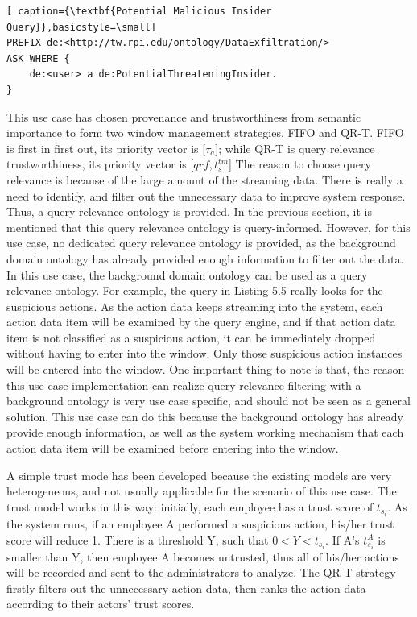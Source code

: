 \begin{lstlisting}[ caption={\textbf{Potential Malicious Insider Query}},basicstyle=\small]
PREFIX de:<http://tw.rpi.edu/ontology/DataExfiltration/>
ASK WHERE { 
    de:<user> a de:PotentialThreateningInsider.
}
\end{lstlisting}

This use case has chosen provenance and trustworthiness from semantic importance to form two window management strategies, FIFO and QR-T. 
FIFO is first in first out, its priority vector is [$\tau_{a}$]; 
while QR-T is query relevance trustworthiness, its priority vector is [$qrf, t^{tm}_{s}$]
The reason to choose query relevance is because of the large amount of the streaming data. 
There is really a need to identify, and filter out the unnecessary data to improve system response. 
Thus, a query relevance ontology is provided. 
In the previous section, it is mentioned that this query relevance ontology is query-informed.
However, for this use case, no dedicated query relevance ontology is provided, as the background domain ontology has already provided enough information to filter out the data. 
In this use case, the background domain ontology can be used as a query relevance ontology. 
For example, the query in Listing 5.5 really looks for the suspicious actions. 
As the action data keeps streaming into the system, each action data item will be examined by the query engine, and if that action data item is not classified as a suspicious action, it can be immediately dropped without having to enter into the window.
Only those suspicious action instances will be entered into the window. 
One important thing to note is that, the reason this use case implementation can realize query relevance filtering with a background ontology is very use case specific, and should not be seen as a general solution. 
This use case can do this because the background ontology has already provide enough information, as well as the system working mechanism that each action data item will be examined before entering into the window. 

A simple trust mode has been developed because the existing models are very heterogeneous, and not usually applicable for the scenario of this use case. 
The trust model works in this way: 
initially, each employee has a trust score of $t_{s_i}$. 
As the system runs, if an employee A performed a suspicious action, his/her trust score will reduce 1. 
There is a threshold Y, such that $0 < Y < t_{s_i}$. 
If A's $t^{A}_{s_i}$ is smaller than Y, then  employee A becomes untrusted, thus all of his/her actions will be recorded and sent to the administrators to analyze. 
The QR-T strategy firstly filters out the unnecessary action data, then ranks the action data according to their actors' trust scores. 
%
